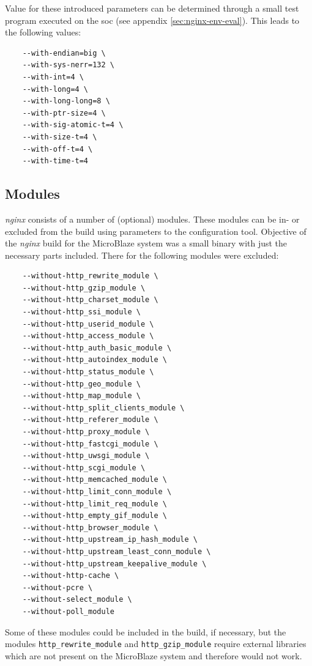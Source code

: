 Value for these introduced parameters can be determined through a small test program executed on the \gls{soc} (see appendix \ref{sec:nginx-env-eval}). This leads to the following values:

\begin{verbatim}
    --with-endian=big \
    --with-sys-nerr=132 \
    --with-int=4 \
    --with-long=4 \
    --with-long-long=8 \
    --with-ptr-size=4 \
    --with-sig-atomic-t=4 \
    --with-size-t=4 \
    --with-off-t=4 \
    --with-time-t=4
\end{verbatim}

\subsection{Modules}

\textit{nginx} consists of a number of (optional) modules. These modules can be in- or excluded from the build using parameters to the configuration tool. Objective of the \textit{nginx} build for the MicroBlaze system was a small binary with just the necessary parts included. There for the following modules were excluded:

\begin{verbatim}
    --without-http_rewrite_module \
    --without-http_gzip_module \
    --without-http_charset_module \
    --without-http_ssi_module \
    --without-http_userid_module \
    --without-http_access_module \
    --without-http_auth_basic_module \
    --without-http_autoindex_module \
    --without-http_status_module \
    --without-http_geo_module \
    --without-http_map_module \
    --without-http_split_clients_module \
    --without-http_referer_module \
    --without-http_proxy_module \
    --without-http_fastcgi_module \
    --without-http_uwsgi_module \
    --without-http_scgi_module \
    --without-http_memcached_module \
    --without-http_limit_conn_module \
    --without-http_limit_req_module \
    --without-http_empty_gif_module \
    --without-http_browser_module \
    --without-http_upstream_ip_hash_module \
    --without-http_upstream_least_conn_module \
    --without-http_upstream_keepalive_module \
    --without-http-cache \
    --without-pcre \
    --without-select_module \
    --without-poll_module
\end{verbatim}

Some of these modules could be included in the build, if necessary, but the modules \texttt{http\_rewrite\_module} and \texttt{http\_gzip\_module} require external libraries which are not present on the MicroBlaze system and therefore would not work.

